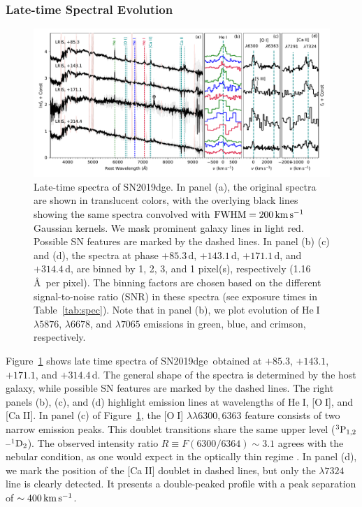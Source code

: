 \documentclass[twocolumn]{aastex63}
\newcommand{\name}{SN2019dge}
\def\ion#1#2{#1$\;${\footnotesize\rm{#2}}\relax}
\begin{document}
\begin{CJK*}{UTF8}{gbsn}
\subsubsection{Late-time  Spectral Evolution}
\begin{figure}[htbp!]
	\centering
	\includegraphics[width=\textwidth]{figures/spectra_late.pdf}
	\caption{Late-time spectra of \name. In panel (a), the original spectra are	
		shown in translucent colors, with the overlying black 
		lines showing the same spectra convolved with ${\rm FWHM} = 200\, {\rm km\, 
			s^{-1}}$ Gaussian kernels. We mask prominent galaxy lines in light red. Possible SN features are 
		marked by the dashed lines. In panel (b) (c) and (d), 
		the spectra at phase $+85.3$\,d, $+143.1$\,d, $+171.1$\,d, and $+314.4$\,d, are 
		binned by 1, 2, 3, and 1 pixel(s), respectively (1.16\,\AA\ per pixel). The binning 
		factors are chosen based on the 
		different signal-to-noise ratio (SNR) in these spectra (see exposure times in 
		Table~\ref{tab:spec}). Note that in panel (b), we plot evolution of \ion{He}{I} $\lambda 5876$, 
		$\lambda 6678$, and $\lambda 7065$ emissions in green, blue, and crimson, respectively.
		\label{fig:spectra_late}}
\end{figure}
Figure~\ref{fig:spectra_late} shows late time spectra of \name\ obtained at $+85.3$, 
$+143.1$, $+171.1$, and $+314.4$\,d.  The general shape of the spectra is determined by the host 
galaxy, while possible SN features are marked by the dashed lines. The right panels (b), (c), and (d) 
highlight emission lines at wavelengths of \ion{He}{I}, [\ion{O}{I}], and [\ion{Ca}{II}]. In panel (c) of 
Figure~\ref{fig:spectra_late}, the [\ion{O}{I}] $\lambda \lambda 6300, 6363$ feature 
consists of two narrow emission peaks. This doublet transitions share the same upper level ($\rm 
^{3}P_{1,2}$--$\rm ^{1}D_2$). The observed intensity ratio $R \equiv F(6300/6364) \sim 3.1$ agrees 
with the nebular condition, as one would expect in the optically thin regime \citep{Leibundgut1991, 
Li1992}. In panel (d), we mark the position of the [\ion{Ca}{II}] doublet in dashed lines, but only the 
$\lambda 7324$ line is clearly detected. It presents a double-peaked profile with a peak separation of 
$\sim 400\,{\rm km\,s^{-1}}$. 


\end{CJK*}
\end{document}
